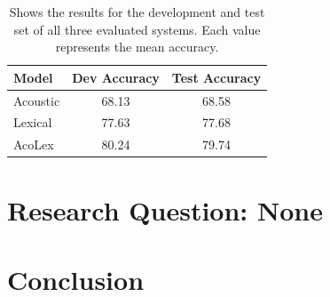 \documentclass[11pt,a4paper]{article}
\begin{document}
\begin{table}[h]
	\centering
	\begin{tabular}{ l | c c}
		\textbf{Model} & Dev Accuracy & Test Accuracy\\
		\hline
		Acoustic & 68.13 & 68.58 \\
		Lexical & 77.63 & 77.68 \\
		AcoLex & 80.24 & 79.74 \\
	\end{tabular}
	\caption{Shows the results for the development and test set of all three evaluated systems. Each value represents the mean accuracy.}
	\label{tab:results}
\end{table}	

\section{Research Question: None}

\section{Conclusion}



\nocite{*}
\end{document}
